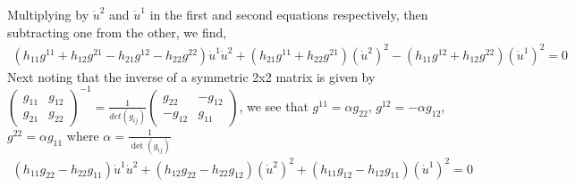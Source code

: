 \documentclass[12pt]{amsart}
\begin{document}
Multiplying by $\dot u^2$ and $\dot u^1$ in the first and second equations respectively, then subtracting one from the other, we find,
\begin{align*}
	(h_{11}g^{11}+h_{12}g^{21}-h_{21}g^{12}-h_{22}g^{22})\dot u^1\dot u^2+(h_{21}g^{11}+h_{22}g^{21})(\dot u^2)^2-(h_{11}g^{12}+h_{12}g^{22})(\dot u^1)^2=0
\end{align*}
Next noting that the inverse of a symmetric 2x2 matrix is given by
$\left(\begin{array}{cc}
	g_{11} & g_{12}
	\\g_{21} & g_{22}
\end{array}\right)^{-1}=\frac{1}{det(g_{ij})}\left(\begin{array}{cc}
	g_{22} & -g_{12}
	\\-g_{12} & g_{11}
\end{array}\right)$, we see that $g^{11}=\alpha g_{22}$, $g^{12}=-\alpha g_{12}$, $g^{22}=\alpha g_{11}$ where $\alpha=\frac{1}{\det(g_{ij})}$
\begin{align*}
	(h_{11}g_{22}-h_{22}g_{11})\dot u^1\dot u^2+(h_{12}g_{22}-h_{22}g_{12})(\dot u^2)^2+(h_{11}g_{12}-h_{12}g_{11})(\dot u^1)^2=0
\end{align*}
\end{document}
